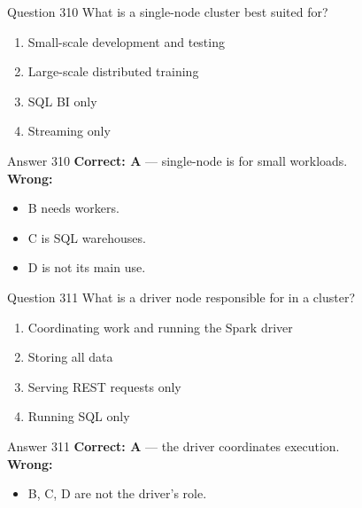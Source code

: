 \documentclass[aspectratio=169,11pt]{beamer}
\begin{document}
	\begin{frame}{Question 310}
		What is a single-node cluster best suited for?
		\begin{enumerate}[label=\Alph*.]
			\item Small-scale development and testing
			\item Large-scale distributed training
			\item SQL BI only
			\item Streaming only
		\end{enumerate}
	\end{frame}
	\begin{frame}{Answer 310}
		\textbf{Correct: A} --- single-node is for small workloads.\\
		\vspace{0.5em}
		\textbf{Wrong:}
		\begin{itemize}
			\item B needs workers.
			\item C is SQL warehouses.
			\item D is not its main use.
		\end{itemize}
	\end{frame}
	
	\begin{frame}{Question 311}
		What is a driver node responsible for in a cluster?
		\begin{enumerate}[label=\Alph*.]
			\item Coordinating work and running the Spark driver
			\item Storing all data
			\item Serving REST requests only
			\item Running SQL only
		\end{enumerate}
	\end{frame}
	\begin{frame}{Answer 311}
		\textbf{Correct: A} --- the driver coordinates execution.\\
		\vspace{0.5em}
		\textbf{Wrong:}
		\begin{itemize}
			\item B, C, D are not the driver's role.
		\end{itemize}
	\end{frame}
	
\end{document}
